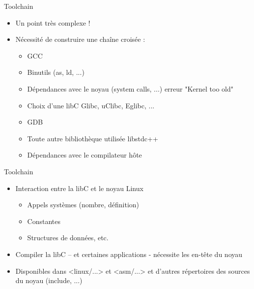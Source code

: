 \begin{frame}{Toolchain}{}
  \begin{itemize}
  \item Un point très complexe !
  \item Nécessité de construire une chaîne croisée :
    \begin{itemize}
    \item GCC
    \item Binutils (as, ld, ...)
    \item Dépendances avec le noyau (system calls, ...) \MVRightarrow erreur "Kernel too old"
    \item Choix d'une libC \MVRightarrow Glibc, uClibc, Eglibc, ...
    \item GDB
    \item Toute autre bibliothèque utilisée \MVRightarrow libstdc++
    \item Dépendances avec le compilateur hôte
    \end{itemize}
  \end{itemize}
\end{frame}

\begin{frame}{Toolchain}{}
  \begin{itemize}
  \item Interaction entre la libC et le noyau Linux
    \begin{itemize}
    \item Appels systèmes (nombre, définition)
    \item Constantes
    \item Structures de données, etc.
    \end{itemize}
  \item Compiler la libC – et certaines applications - nécessite les en-tête du noyau
  \item Disponibles dans <linux/...> et <asm/...> et d'autres répertoires des sources du noyau (include, ...)
  \end{itemize}
\end{frame}

